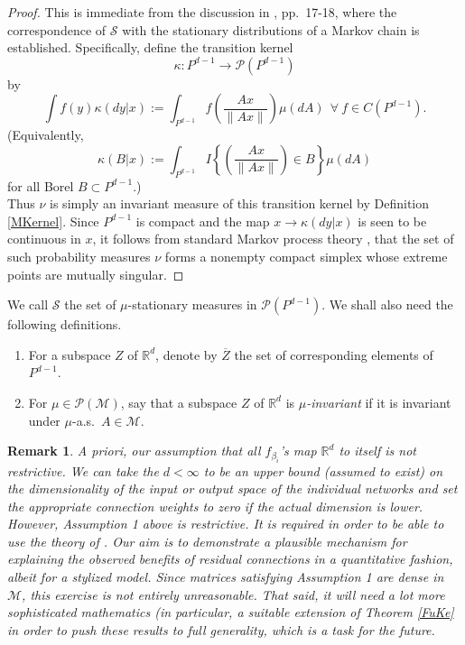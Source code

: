 \documentclass[10pt,a4paper]{amsart}
\newtheorem{remark}[theorem]{Remark}
\newcommand{\R}{\mathbb{R}}
\newcommand{\M}{\mathcal{M}}
\newcommand{\PA}{\mathcal{P}}
\newcommand{\SA}{\mathcal{S}}
\newcommand{\0}{\textbf{0}}
\begin{document}
\begin{proof} This is immediate from the discussion in \cite{FK}, pp.\ 17-18, where the correspondence of $\SA$ with the stationary distributions of a Markov chain is established. Specifically, define the transition kernel 
$$\kappa : P^{d-1} \to \PA(P^{d-1})$$ 
by
$$\int f(y)\kappa(dy|x) := \int_{P^{d-1}}f\left(\frac{Ax}{\|Ax\|}\right)\mu(dA) \ \ \forall \ f \in C\left(P^{d-1}\right).$$
(Equivalently, $$\kappa(B|x) := \int_{P^{d-1}}I\left\{\left(\frac{Ax}{\|Ax\|}\right)\in B\right\}\mu(dA)$$
for all Borel $B \subset P^{d-1}$.) \\

Thus $\nu$ is simply an invariant measure of this transition kernel by Definition \ref{MKernel}. Since $P^{d-1}$ is compact and the map $x \to \kappa(dy|x)$ is  seen to be continuous in $x$, it follows from standard Markov process theory \cite{Benaim}, \cite{MeynTweedie} that the set of such probability measures $\nu$ forms a nonempty compact simplex whose extreme points are mutually singular. \end{proof}

\medskip

We call $\SA$ the set of $\mu$-stationary measures in $\PA(P^{d-1})$. We shall also need the following definitions.\\

\begin{enumerate}

\item For a subspace $Z$ of $\R^d$, denote by $\overline{Z}$ the set of corresponding elements of $P^{d-1}$.\\

\item For $\mu \in \PA(\M)$, say that a subspace $Z$ of $\R^d$ is  \textit{$\mu$-invariant} if it is invariant under $\mu$-a.s.\ $A \in \M$.
\end{enumerate}

\begin{remark}\label{DIM} A priori, our assumption that all $f_{\beta_i}$'s map $\R^d$ to itself is not restrictive. We can take the $d < \infty$ to be an upper bound (assumed to exist) on the dimensionality of the input or output space of the individual networks and set the appropriate connection weights to zero if the actual dimension is lower. However,  Assumption 1 above is  restrictive. It is required in order to be able to use the theory of \cite{FK}.  Our aim is to demonstrate a plausible mechanism for explaining the observed benefits of residual connections in a quantitative fashion, albeit for a stylized model. Since matrices satisfying Assumption 1 are dense in $\M$, this exercise is not entirely unreasonable. That said, it will need a lot more sophisticated mathematics (in particular, a suitable extension of Theorem \ref{FuKe} in order to push these results to full generality, which is a task for the future. \end{remark}
\end{document}
